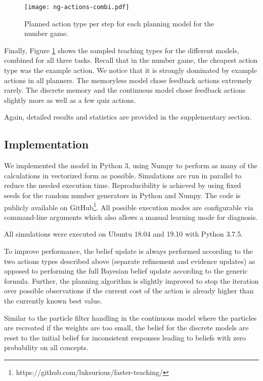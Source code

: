 \begin{figure}
    \centering
    \texttt{[image: ng-actions-combi.pdf]}
    \caption{Planned action type per step for each planning model for the number game. 
    }
    \label{fig:actions-t2}
\end{figure}

Finally, Figure \ref{fig:actions-t2} shows the sampled teaching types for the different models, combined for all three tasks.
Recall that in the number game, the cheapest action type was the example action.
We notice that it is strongly dominated by example actions in all planners.
The memoryless model chose feedback actions extremely rarely. 
The discrete memory and the continuous model chose feedback actions slightly more as well as a few quiz actions.

Again, detailed results and statistics are provided in the supplementary section.

\subsection{Implementation}

We implemented the model in Python 3, using Numpy to perform as many of the calculations in vectorized form as possible. 
Simulations are run in parallel to reduce the needed execution time. 
Reproducibility is achieved by using fixed seeds for the random number generators in Python and Numpy. 
The code is publicly available on GitHub\footnote{https://github.com/luksurious/faster-teaching/}. 
All possible execution modes are configurable via command-line arguments which also allows a manual learning mode for diagnosis. 

All simulations were executed on Ubuntu 18.04 and 19.10 with Python 3.7.5.

To improve performance, the belief update is always performed according to the two actions types described above (separate refinement and evidence updates) as opposed to performing the full Bayesian belief update according to the generic formula. 
Further, the planning algorithm is slightly improved to stop the iteration over possible observations if the current cost of the action is already higher than the currently known best value.

Similar to the particle filter handling in the continuous model where the particles are recreated if the weights are too small, the belief for the discrete models are reset to the initial belief for inconsistent responses leading to beliefs with zero probability on all concepts.

